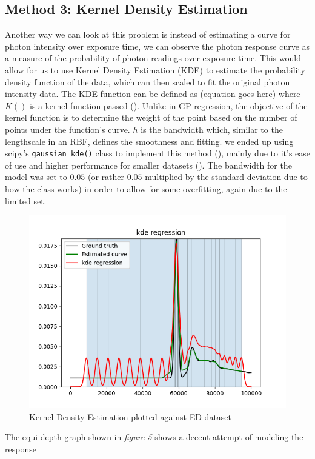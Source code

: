 \documentclass[letterpaper,12pt]{article}
\begin{document}
\subsection{Method 3: Kernel Density Estimation}
Another way we can look at this problem is instead of estimating a curve for photon intensity
over exposure time, we can observe the photon response curve as a measure of the probability of 
photon readings over exposure time. This would allow for us to use Kernel Density Estimation (KDE)
to estimate the probability density function of the data, which can then scaled to fit the 
original photon intensity data. The KDE function can be defined as (equation goes here) where
$K()$ is a kernel function passed (\cite{chen2018lecture}). Unlike in GP regression, the 
objective of the kernel function is to determine the weight of the point based on the number 
of points under the function's curve. $h$ is the bandwidth which, similar to the lengthscale 
in an RBF, defines the smoothness and fitting. we ended up using scipy's \verb|gaussian_kde()| 
class to implement this method (\cite{virtanen2020scipy}), mainly due to it's ease of use 
and higher performance for smaller datasets (\cite{VanderPlas_2023}). The bandwidth for the
model was set to $0.05$ (or rather $0.05$ multiplied by the standard deviation due to how
the class works) in order to allow for some overfitting, again due to the limited set.
\begin{figure}[H]
\centering
\includegraphics[width=\linewidth]{kde_edh_graph}
\caption{Kernel Density Estimation plotted against ED dataset}
\end{figure}
The equi-depth graph shown in \emph{figure 5} shows a decent attempt of modeling the response
\end{document}
